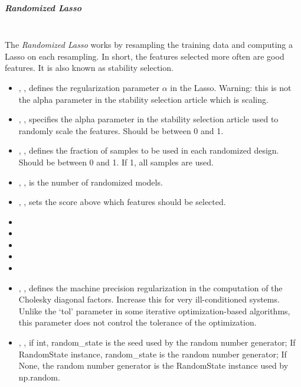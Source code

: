 \subparagraph{Randomized Lasso}
\mbox{}
\\The \textit{Randomized Lasso} works by resampling the training data and
computing a Lasso on each resampling.
%
In short, the features selected more often are good features.
%
It is also known as stability selection.
%
\begin{itemize}
  \item {}, , defines the
  regularization parameter $\alpha$ in the Lasso.
  Warning: this is not the alpha parameter in the stability selection article
  which is scaling. 
  \item {}, , specifies the alpha
  parameter in the stability selection article used to randomly scale the
  features. 
  Should be between 0 and 1.
  \item {}, , defines
  the fraction of samples to be used in each randomized design.
  Should be between 0 and 1.
  If 1, all samples are used.
  \item {}, , is the number of
  randomized models.
  \item {}, , sets
  the score above which features should be selected.
  \item {}
  \item \verDescriptionB
  \item {}
  \item \precomputeDescription{}
  \item \maxIterDescription{}
  \item {}, , defines the machine
  precision regularization in the computation of the Cholesky diagonal factors.
  Increase this for very ill-conditioned systems.
  Unlike the `tol' parameter in some iterative optimization-based algorithms,
  this parameter does not control the tolerance of the optimization.
  \item {}, , if int, random\_state is the seed used by the random number
  generator; If RandomState instance, random\_state is the random
  number generator; If None, the random number generator is the RandomState
  instance used by np.random.
\end{itemize}

